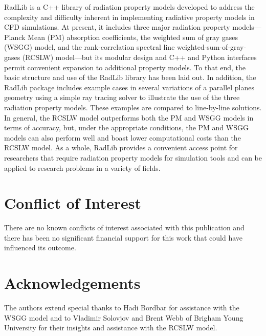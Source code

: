 \documentclass[preprint,12pt, a4paper]{elsarticle}
\begin{document}
RadLib is a C++ library of radiation property models developed to address the complexity and difficulty inherent in implementing radiative property models in CFD simulations. At present, it includes three major radiation property models---Planck Mean (PM) absorption coefficients, the weighted sum of gray gases (WSGG) model, and the rank-correlation spectral line weighted-sum-of-gray-gases (RCSLW) model---but its modular design and C++ and Python interfaces permit convenient expansion to additional property models. To that end, the basic structure and use of the RadLib library has been laid out. In addition, the RadLib package includes example cases in several variations of a parallel planes geometry using a simple ray tracing solver to illustrate the use of the three radiation property models. These examples are compared to line-by-line solutions. In general, the RCSLW model outperforms both the PM and WSGG models in terms of accuracy, but, under the appropriate conditions, the PM and WSGG models can also perform well and boast lower computational costs than the RCSLW model. As a whole, RadLib provides a convenient access point for researchers that require radiation property models for simulation tools and can be applied to research problems in a variety of fields. 


\section{Conflict of Interest} \label{s:coi}

There are no known conflicts of interest associated with this publication and there has been no significant financial support for this work that could have influenced its outcome.


\section*{Acknowledgements} \label{sec:acknowledgements}

The authors extend special thanks to Hadi Bordbar for assistance with the WSGG model and to Vladimir Solovjov and Brent Webb of Brigham Young University for their insights and assistance with the RCSLW model. 

\end{document}
